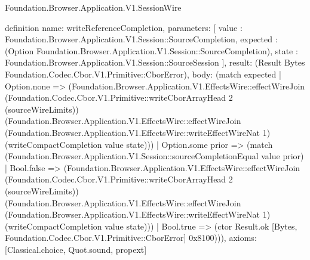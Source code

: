 \begin{lexlean}{Foundation.Browser.Application.V1.SessionWire}
\begin{semanticmodule}
definition{
  name: writeReferenceCompletion,
  parameters: [
    value : Foundation.Browser.Application.V1.Session::SourceCompletion,
    expected : (Option Foundation.Browser.Application.V1.Session::SourceCompletion),
    state : Foundation.Browser.Application.V1.Session::SourceSession
  ],
  result: (Result Bytes Foundation.Codec.Cbor.V1.Primitive::CborError),
  body: (match expected
    | Option.none => (Foundation.Browser.Application.V1.EffectsWire::effectWireJoin (Foundation.Codec.Cbor.V1.Primitive::writeCborArrayHead 2 (sourceWireLimits)) (Foundation.Browser.Application.V1.EffectsWire::effectWireJoin (Foundation.Browser.Application.V1.EffectsWire::writeEffectWireNat 1) (writeCompactCompletion value state)))
    | Option.some prior => (match (Foundation.Browser.Application.V1.Session::sourceCompletionEqual value prior)
      | Bool.false => (Foundation.Browser.Application.V1.EffectsWire::effectWireJoin (Foundation.Codec.Cbor.V1.Primitive::writeCborArrayHead 2 (sourceWireLimits)) (Foundation.Browser.Application.V1.EffectsWire::effectWireJoin (Foundation.Browser.Application.V1.EffectsWire::writeEffectWireNat 1) (writeCompactCompletion value state)))
      | Bool.true => (ctor Result.ok [Bytes, Foundation.Codec.Cbor.V1.Primitive::CborError] 0x8100))),
  axioms: [Classical.choice, Quot.sound, propext]
}


\end{semanticmodule}
\end{lexlean}
